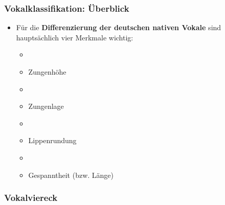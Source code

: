 \begin{frame}
\frametitle{Vokalklassifikation: Überblick}

	\begin{itemize}
		\item Für die \textbf{Differenzierung der deutschen nativen Vokale} sind hauptsächlich vier Merkmale wichtig:
		
		\begin{itemize}
			\item[]
			\item Zungenhöhe
			\item[]
			\item Zungenlage
			\item[]
			\item Lippenrundung
			\item[]
			\item Gespanntheit (bzw. Länge)
		\end{itemize}
		
	\end{itemize}
	
\end{frame}


\subsubsection{Vokalviereck}


